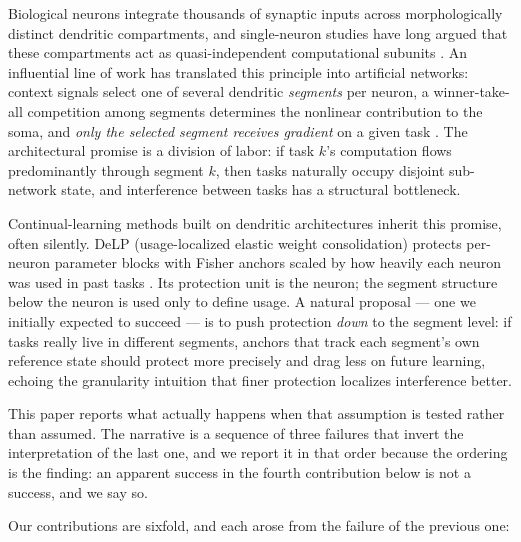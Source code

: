 \documentclass[10pt]{article}
\newcommand{\delp}{DeLP}
\begin{document}
Biological neurons integrate thousands of synaptic inputs across morphologically
distinct dendritic compartments, and single-neuron studies have long argued
that these compartments act as quasi-independent computational subunits
\citep{poirazi2003,london2005,poirazi2020}. An influential line of work has
translated this principle into artificial networks: context signals select
one of several dendritic \emph{segments} per neuron, a winner-take-all
competition among segments determines the nonlinear contribution to the
soma, and \emph{only the selected segment receives gradient} on a given task
\citep{iyer2022}. The architectural promise is a division of labor: if task
$k$'s computation flows predominantly through segment $k$, then tasks
naturally occupy disjoint sub-network state, and interference between tasks
has a structural bottleneck.

Continual-learning methods built on dendritic architectures inherit this
promise, often silently. \delp{} (usage-localized elastic weight
consolidation) protects per-neuron parameter blocks with Fisher anchors
scaled by how heavily each neuron was used in past tasks
\citep{zhou2026delp,kirkpatrick2017}. Its protection unit is the neuron; the
segment structure below the neuron is used only to define usage. A natural
proposal --- one we initially expected to succeed --- is to push protection
\emph{down} to the segment level: if tasks really live in different segments,
anchors that track each segment's own reference state should protect more
precisely and drag less on future learning, echoing the granularity
intuition that finer protection localizes interference better.

This paper reports what actually happens when that assumption is tested
rather than assumed. The narrative is a sequence of three failures that
invert the interpretation of the last one, and we report it in that order
because the ordering is the finding: an apparent success in the fourth
contribution below is not a success, and we say so.

Our contributions are sixfold, and each arose from the failure of the
previous one:
\end{document}
